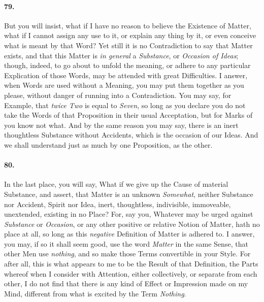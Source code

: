 \documentclass[]{article}
\newenvironment{sectionbody}{}{}
\begin{document}
\begin{sectionbody}
\paragraph{79.} But you will insist, what if I have no reason to believe the
Existence of Matter, what if I cannot assign any use to it, or
explain any thing by it, or even conceive what is meant by that
Word?  Yet still it is no Contradiction to say that Matter
exists, and that this Matter is \emph{in general} a
\emph{Substance}, or \emph{Occasion of Ideas}; though,
indeed, to go about to unfold the meaning, or adhere to any
particular Explication of those Words, may be attended with great
Difficulties.  I answer, when Words are used without a Meaning,
you may put them together as you please, without danger of
running into a Contradiction.  You may say, for Example, that
\emph{twice Two} is equal to \emph{Seven}, so long as you
declare you do not take the Words of that Proposition in their
usual Acceptation, but for Marks of you know not what.  And by
the same reason you may say, there is an inert thoughtless
Substance without Accidents, which is the occasion of our Ideas.
And we shall understand just as much by one Proposition, as the
other.



\paragraph{80.} In the last place, you will say, What if we give up the Cause of
material Substance, and assert, that Matter is an unknown
\emph{Somewhat}, neither Substance nor Accident, Spirit nor
Idea, inert, thoughtless, indivisible, immoveable, unextended,
existing in no Place?  For, say you, Whatever may be urged
against \emph{Substance} or \emph{Occasion}, or any other
positive or relative Notion of Matter, hath no place at all, so
long as this \emph{negative} Definition of Matter is adhered
to.  I answer, you may, if so it shall seem good, use the word
\emph{Matter} in the same Sense, that other Men use
\emph{nothing}, and so make those Terms convertible in your
Style.  For after all, this is what appears to me to be the
Result of that Definition, the Parts whereof when I consider with
Attention, either collectively, or separate from each other, I do
not find that there is any kind of Effect or Impression made on
my Mind, different from what is excited by the Term
\emph{Nothing}.




\end{sectionbody}
\end{document}
